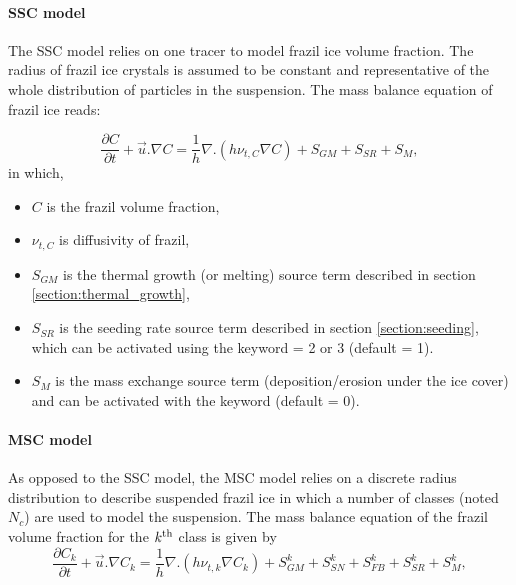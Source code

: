 \paragraph{SSC model}
The SSC model relies on one tracer to model frazil ice volume fraction.
The radius of frazil ice crystals is assumed to be constant and representative of the whole
distribution of particles in the suspension. The mass balance equation of frazil ice reads:

\begin{equation}
  \frac{\partial C}{\partial t} + \vec{u} . \nabla C = \dfrac{1}{h} \nabla . \left( h \nu_{t,C}  \nabla C \right) +  S_{GM} + S_{SR} + S_M,
\label{eq:model:frazil}
\end{equation}
in which,
\begin{itemize}
	\item $C$ is the frazil volume fraction,
	\item $\nu_{t,C}$ is diffusivity of frazil,
	\item $S_{GM}$ is the thermal growth (or melting) source term described in section \ref{section:thermal_growth},
	\item $S_{SR}$ is the seeding rate source term described in section \ref{section:seeding}, which can be activated using the keyword  = 2 or 3 (default = 1).
  \item $S_M$ is the mass exchange source term (deposition/erosion under the ice cover) and can be activated with the keyword  (default = 0).
\end{itemize}

\paragraph{MSC model}
As opposed to the SSC model, the MSC model relies on
a discrete radius distribution to describe suspended frazil ice in which
a number of classes (noted $N_c$) are used to model the suspension.
The mass balance equation of the frazil volume fraction for the $k^{\rm{th}}$ class is given by
\begin{equation}
\frac{\partial C_{k}}{\partial t} + \vec{u} . \nabla C_{k} = \dfrac{1}{h}  \nabla . \left( h\nu_{t,k}  \nabla C_k \right) +  S_{GM}^{k} + S_{SN}^{k} + S_{FB}^{k} + S_{SR}^{k} + S_M^k,
\label{eq:model:frazil}
\end{equation}

